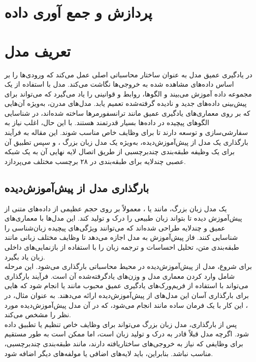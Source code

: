 \section{پردازش و جمع آوری داده}

\section{تعریف مدل}
در یادگیری عمیق مدل به عنوان ساختار محاسباتی اصلی عمل می‌کند که ورودی‌ها را بر اساس داده‌های مشاهده شده به خروجی‌ها نگاشت می‌کند. مدل با استفاده از یک مجموعه داده آموزش می‌بیند و الگوها، روابط و قوانینی را یاد می‌گیرد که می‌تواند برای پیش‌بینی داده‌های جدید و نادیده گرفته‌شده تعمیم یابد. مدل‌های مدرن، به‌ویژه آن‌هایی که بر روی معماری‌های یادگیری عمیق مانند ترانسفورمرها ساخته شده‌اند، در شناسایی الگوهای پیچیده در داده‌ها بسیار قدرتمند هستند. با این حال، اغلب نیاز به سفارشی‌سازی و توسعه دارند تا برای وظایف خاص مناسب شوند. این مقاله به فرآیند بارگذاری یک مدل از پیش‌آموزش‌دیده، به‌ویژه یک مدل زبان بزرگ ، و سپس تطبیق آن برای یک وظیفه طبقه‌بندی چند‌برچسبی از طریق اتصال لایه نهایی آن به یک شبکه عصبی چندلایه  برای طبقه‌بندی در ۲۸ برچسب مختلف می‌پردازد.
\subsection{بارگذاری مدل از پیش‌آموزش‌دیده}

یک مدل زبان بزرگ، مانند  یا ، معمولاً بر روی حجم عظیمی از داده‌های متنی از پیش‌آموزش دیده تا بتواند زبان طبیعی را درک و تولید کند. این مدل‌ها با معماری‌های عمیق و چندلایه طراحی شده‌اند که می‌توانند ویژگی‌های پیچیده زبان‌شناسی را شناسایی کنند. فاز پیش‌آموزش به مدل اجازه می‌دهد تا وظایف مختلف زبانی مانند طبقه‌بندی متن، تحلیل احساسات و ترجمه زبان را با استفاده از بازنمایی‌های داخلی زبان یاد بگیرد.
\\
برای شروع، مدل از پیش‌آموزش‌دیده در محیط محاسباتی بارگذاری می‌شود. این مرحله شامل وارد کردن معماری مدل و وزن‌های یادگرفته‌شده آن است. فرآیند بارگذاری می‌تواند با استفاده از فریم‌ورک‌های یادگیری عمیق محبوب مانند  یا  انجام شود که  هایی برای بارگذاری آسان این مدل‌های از پیش‌آموزش‌دیده ارائه می‌دهند.
به عنوان مثال، در ، این کار با یک فرمان ساده مانند  انجام می‌شود، که در آن  مدل پیش‌آموزش‌دیده مورد نظر را مشخص می‌کند.
\\
پس از بارگذاری، مدل زبان بزرگ می‌تواند برای وظایف خاص تنظیم یا تطبیق داده شود. اگرچه مدل قبلاً قادر به درک و تولید زبان است، اما ممکن است به طور مستقیم برای وظایفی که نیاز به خروجی‌های ساختاریافته دارند، مانند طبقه‌بندی چند‌برچسبی، مناسب نباشد. بنابراین، باید لایه‌های اضافی یا مولفه‌های دیگر اضافه شود.
